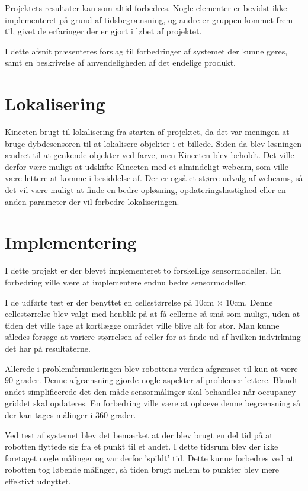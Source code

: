 Projektets resultater kan som altid forbedres.
Nogle elementer er bevidst ikke implementeret på grund af tidsbegrænsning, og andre er gruppen kommet frem til, givet de erfaringer der er gjort i løbet af projektet.

I dette afsnit præsenteres forslag til forbedringer af systemet der kunne gøres, samt en beskrivelse af anvendeligheden af det endelige produkt.

\section{Lokalisering}
Kinecten brugt til lokalisering fra starten af projektet, da det var meningen at bruge dybdesensoren til at lokalisere objekter i et billede.
Siden da blev løsningen ændret til at genkende objekter ved farve, men Kinecten blev beholdt.
Det ville derfor være muligt at udskifte Kinecten med et almindeligt webcam, som ville være lettere at komme i besiddelse af. 
Der er også et større udvalg af webcams, så det vil være muligt at finde en bedre opløsning, opdateringshastighed eller en anden parameter der vil forbedre lokaliseringen.

\section{Implementering}
I dette projekt er der blevet implementeret to forskellige sensormodeller. 
En forbedring ville være at implementere endnu bedre sensormodeller.

I de udførte test er der benyttet en cellestørrelse på 10cm $ \times $ 10cm.
Denne cellestørrelse blev valgt med henblik på at få cellerne så små som muligt, uden at tiden det ville tage at kortlægge området ville blive alt for stor.
Man kunne således forsøge at variere størrelsen af celler for at finde ud af hvilken indvirkning det har på resultaterne.

Allerede i problemformuleringen blev robottens verden afgrænset til kun at være 90 grader. 
Denne afgrænsning gjorde nogle aspekter af problemer lettere. 
Blandt andet simplificerede det den måde sensormålinger skal behandles når occupancy griddet skal opdateres.
En forbedring ville være at ophæve denne begrænsning så der kan tages målinger i 360 grader.

Ved test af systemet blev det bemærket at der blev brugt en del tid på at robotten flyttede sig fra et punkt til et andet.
I dette tidsrum blev der ikke foretaget nogle målinger og var derfor 'spildt' tid. 
Dette kunne forbedres ved at robotten tog løbende målinger, så tiden brugt mellem to punkter blev mere effektivt udnyttet.

